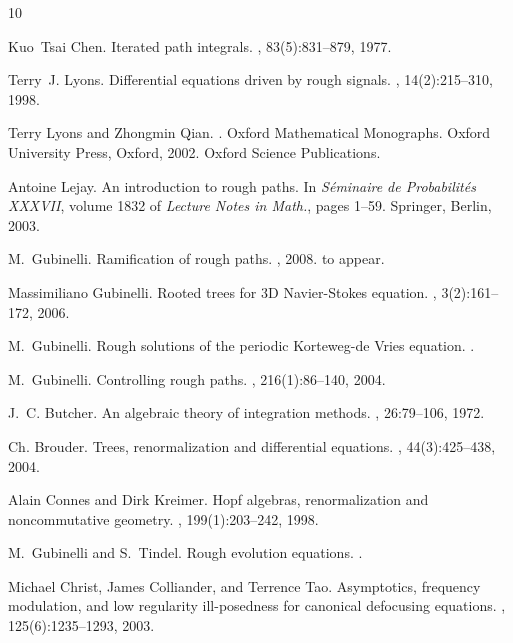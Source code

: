 \documentclass[a4paper]{article}
\newcommand{\1}{{\bf 1}}
\begin{document}
%
%
\begin{thebibliography}{10}

Kuo~Tsai Chen.
\newblock Iterated path integrals.
, 83(5):831--879, 1977.

Terry~J. Lyons.
\newblock Differential equations driven by rough signals.
, 14(2):215--310, 1998.

Terry Lyons and Zhongmin Qian.
.
\newblock Oxford Mathematical Monographs. Oxford University Press, Oxford,
  2002.
\newblock Oxford Science Publications.

Antoine Lejay.
\newblock An introduction to rough paths.
\newblock In {\em S\'eminaire de Probabilit\'es XXXVII}, volume 1832 of {\em
  Lecture Notes in Math.}, pages 1--59. Springer, Berlin, 2003.

M.~Gubinelli.
\newblock Ramification of rough paths.
, 2008.
\newblock to appear.

Massimiliano Gubinelli.
\newblock Rooted trees for 3{D} {N}avier-{S}tokes equation.
, 3(2):161--172, 2006.

M.~Gubinelli.
\newblock Rough solutions of the periodic {K}orteweg-de {V}ries equation.
.

M.~Gubinelli.
\newblock Controlling rough paths.
, 216(1):86--140, 2004.

J.~C. Butcher.
\newblock An algebraic theory of integration methods.
, 26:79--106, 1972.

Ch. Brouder.
\newblock Trees, renormalization and differential equations.
, 44(3):425--438, 2004.

Alain Connes and Dirk Kreimer.
\newblock Hopf algebras, renormalization and noncommutative geometry.
, 199(1):203--242, 1998.

M.~Gubinelli and S.~Tindel.
\newblock Rough evolution equations.
.

Michael Christ, James Colliander, and Terrence Tao.
\newblock Asymptotics, frequency modulation, and low regularity ill-posedness
  for canonical defocusing equations.
, 125(6):1235--1293, 2003.


\end{thebibliography}
\end{document}
